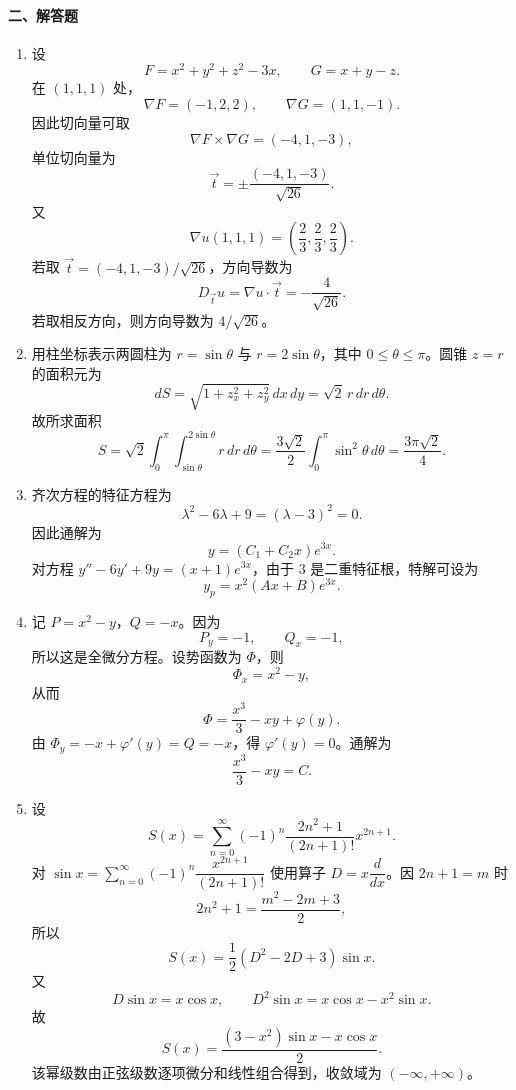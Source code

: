 \paragraph*{二、解答题}
\begin{enumerate}
  \item 设
  \[
    F=x^2+y^2+z^2-3x,\qquad G=x+y-z.
  \]
  在 $(1,1,1)$ 处，
  \[
    \nabla F=(-1,2,2),\qquad \nabla G=(1,1,-1).
  \]
  因此切向量可取
  \[
    \nabla F\times\nabla G=(-4,1,-3),
  \]
  单位切向量为
  \[
    \vec t=\pm\frac{(-4,1,-3)}{\sqrt{26}}.
  \]
  又
  \[
    \nabla u(1,1,1)=\left(\frac23,\frac23,\frac23\right).
  \]
  若取 $\vec t=(-4,1,-3)/\sqrt{26}$，方向导数为
  \[
    D_{\vec t}u=\nabla u\cdot \vec t=-\frac4{\sqrt{26}}.
  \]
  若取相反方向，则方向导数为 $4/\sqrt{26}$。
  \item 用柱坐标表示两圆柱为 $r=\sin\theta$ 与 $r=2\sin\theta$，其中 $0\le\theta\le\pi$。圆锥 $z=r$ 的面积元为
  \[
    dS=\sqrt{1+z_x^2+z_y^2}\,dx\,dy=\sqrt2\,r\,dr\,d\theta.
  \]
  故所求面积
  \[
    S=\sqrt2\int_0^\pi\int_{\sin\theta}^{2\sin\theta}r\,dr\,d\theta
    =\frac{3\sqrt2}{2}\int_0^\pi\sin^2\theta\,d\theta
    =\frac{3\pi\sqrt2}{4}.
  \]
  \item 齐次方程的特征方程为
  \[
    \lambda^2-6\lambda+9=(\lambda-3)^2=0.
  \]
  因此通解为
  \[
    y=(C_1+C_2x)e^{3x}.
  \]
  对方程 $y''-6y'+9y=(x+1)e^{3x}$，由于 $3$ 是二重特征根，特解可设为
  \[
    y_p=x^2(Ax+B)e^{3x}.
  \]
  \item 记 $P=x^2-y$，$Q=-x$。因为
  \[
    P_y=-1,\qquad Q_x=-1,
  \]
  所以这是全微分方程。设势函数为 $\Phi$，则
  \[
    \Phi_x=x^2-y,
  \]
  从而
  \[
    \Phi=\frac{x^3}{3}-xy+\varphi(y).
  \]
  由 $\Phi_y=-x+\varphi'(y)=Q=-x$，得 $\varphi'(y)=0$。通解为
  \[
    \frac{x^3}{3}-xy=C.
  \]
  \item 设
  \[
    S(x)=\sum_{n=0}^{\infty}(-1)^n\frac{2n^2+1}{(2n+1)!}x^{2n+1}.
  \]
  对 $\sin x=\sum_{n=0}^\infty(-1)^n\dfrac{x^{2n+1}}{(2n+1)!}$ 使用算子 $D=x\dfrac{d}{dx}$。因 $2n+1=m$ 时
  \[
    2n^2+1=\frac{m^2-2m+3}{2},
  \]
  所以
  \[
    S(x)=\frac12(D^2-2D+3)\sin x.
  \]
  又
  \[
    D\sin x=x\cos x,\qquad D^2\sin x=x\cos x-x^2\sin x.
  \]
  故
  \[
    S(x)=\frac{(3-x^2)\sin x-x\cos x}{2}.
  \]
  该幂级数由正弦级数逐项微分和线性组合得到，收敛域为 $(-\infty,+\infty)$。
\end{enumerate}

